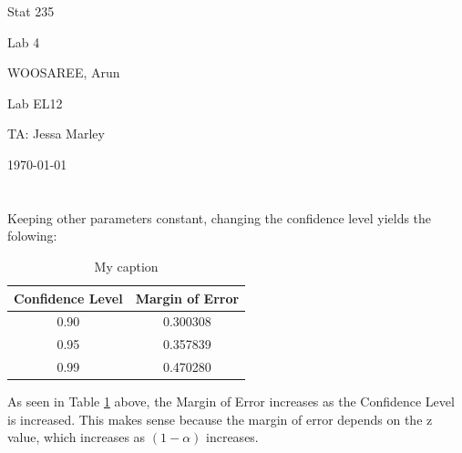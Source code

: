 \documentclass[letterpaper]{article}
\begin{document}
\begin{titlepage}
 \begin{center}
  \vspace*{1cm}
  \Huge
  Stat 235
  \vspace{1cm}
  
  Lab 4
  \vspace{1cm}
  
  WOOSAREE, Arun
  \vspace{1cm}
  
  \Huge
  Lab EL12
  \vspace{1cm}
  
  TA: Jessa Marley
  \vspace{1cm}
  
  \today
  \vfill
 \end{center}
\end{titlepage}

\section{}%

\subsection{}%
Keeping other parameters constant, changing the confidence level yields the folowing:
\begin{table}[H]
 \centering
 \begin{tabular}{|c|c|}
  \hline
  Confidence Level & Margin of Error \\ \hline
  0.90             & 0.300308        \\ \hline
  0.95             & 0.357839        \\ \hline
  0.99             & 0.470280        \\ \hline
 \end{tabular}
 \caption{My caption}
 \label{1a}
\end{table}
As seen in Table \ref{1a} above, the Margin of Error increases as the
Confidence Level is increased. This makes sense because the margin of error depends on the z value, which increases as $(1-\alpha)$ increases.
\end{document}
